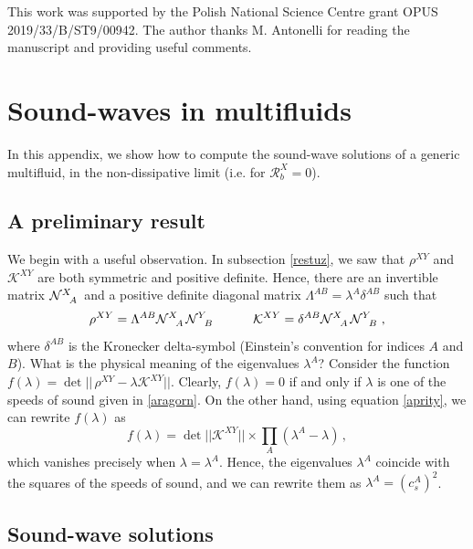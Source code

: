 \documentclass[a4paper, amsfonts, amssymb, amsmath, reprint, showkeys, nofootinbib, twoside, onecolumn,notitlepage]{revtex4-1}
\newcommand{\spc}{\quad \quad \quad}
\theoremstyle{definition}
\theoremstyle{theorem}
\begin{document}
This work was supported by the Polish National Science Centre grant OPUS 2019/33/B/ST9/00942. The author thanks M. Antonelli for reading the manuscript and providing useful comments. 

\appendix


\section{Sound-waves in multifluids}\label{Intotheory}

In this appendix, we show how to compute the sound-wave solutions of a generic multifluid, in the non-dissipative limit (i.e. for $\mathcal{R}^X_b=0$). 


\subsection{A preliminary result}

We begin with a useful observation. 
In subsection \ref{restuz}, we saw that $\rho^{XY}$ and $\mathcal{K}^{XY}$ are both symmetric and positive definite. Hence, there are an invertible matrix $\mathcal{N}\indices{^X _A}$ and a positive definite diagonal matrix $\Lambda^{AB}=\lambda^{A} \delta^{AB}$ such that 
\begin{equation}\label{aprity}
\rho^{XY}= \Lambda^{AB} \mathcal{N}\indices{^X _A}\mathcal{N}\indices{^Y _B} \spc \mathcal{K}^{XY}= \delta^{AB} \mathcal{N}\indices{^X _A}\mathcal{N}\indices{^Y _B} \, ,
\end{equation}
where $\delta^{AB}$ is the Kronecker delta-symbol (Einstein's convention for indices $A$ and $B$). What is the physical meaning of the eigenvalues $\lambda^A$? Consider the function
$
f(\lambda)= \det || \, \rho^{XY}- \lambda \mathcal{K}^{XY} || 
$.
Clearly, $f(\lambda)=0$ if and only if $\lambda$ is one of the speeds of sound given in \eqref{aragorn}. On the other hand, using equation \eqref{aprity}, we can rewrite $f(\lambda)$ as
\begin{equation}
f(\lambda) =  \det || \mathcal{K}^{XY}  || \times  \prod_A (\lambda^A-\lambda) \, ,
\end{equation}
which vanishes precisely when $\lambda = \lambda^A$. Hence, the eigenvalues $\lambda^A$ coincide with the squares of the speeds of sound, and we can rewrite them as $\lambda^A=(c_s^A)^2$. 

\subsection{Sound-wave solutions}
\end{document}
